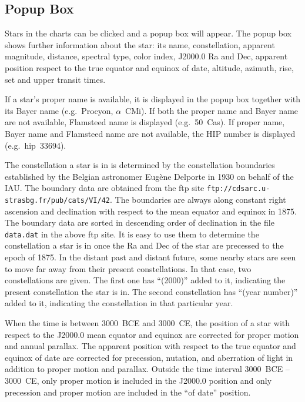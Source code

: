 \documentclass[12pt]{article}
\begin{document}
\subsection{Popup Box} 
\label{sec:starsPopup}

Stars in the charts can be clicked and a popup box 
will appear. The popup box shows further information about the star: its name, 
constellation, 
apparent magnitude, distance, spectral type, color index, J2000.0 Ra and Dec, 
apparent position respect to the true equator and equinox of date, altitude, 
azimuth, rise, set and upper transit times. 

If a star's proper name is available, it is displayed in the 
popup box together with its Bayer name (e.g.\ Procyon, $\alpha$~CMi). 
If both the proper name and Bayer name are not available, Flamsteed 
name is displayed (e.g.\ 50~Cas). If proper name, Bayer name and 
Flamsteed name are not available, the HIP number is displayed (e.g.\ hip~33694). 

The constellation a star is in is determined by the constellation boundaries 
established by the Belgian astronomer Eug\`ene Delporte in 1930 on behalf of 
the IAU. The boundary data are obtained from the ftp site 
{\tt ftp://cdsarc.u-strasbg.fr/pub/cats/VI/42}. 
The boundaries are always along constant right ascension and declination 
with respect to the mean equator and equinox in 1875. The boundary data 
are sorted in descending order of declination in the file {\tt data.dat} in 
the above ftp site. It is easy to use them to determine the constellation a star 
is in once the Ra and Dec of the star are precessed to the epoch of 1875. 
In the distant past and distant future, some nearby stars are seen 
to move far away from their present constellations. In that case, 
two constellations are given. The first one has ``(2000)'' added to it, 
indicating the present constellation the star is in. The second constellation has 
``(year number)'' added to it, indicating the constellation in that particular year.

When the time is between 3000~BCE and 3000~CE, the position of a star 
with respect to the J2000.0 mean equator and equinox are corrected for 
proper motion and annual parallax. The apparent position with respect 
to the true equator and equinox of date are corrected for precession, 
nutation, and aberration of light in addition to proper motion and 
parallax. Outside the time interval 3000~BCE -- 3000~CE, only proper 
motion is included in the J2000.0 position and only precession and 
proper motion are included in the ``of date'' position. 
\end{document}
